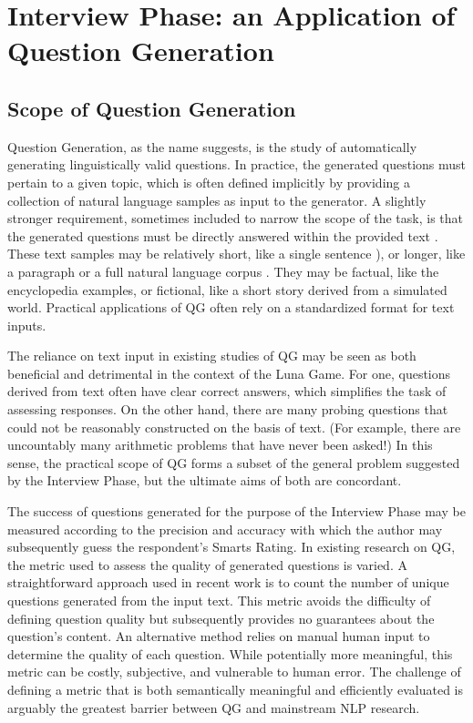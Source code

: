 \section{Interview Phase: an Application of Question Generation}

\subsection{Scope of Question Generation}

Question Generation, as the name suggests, is the study of automatically generating linguistically valid questions. In practice, the generated questions must pertain to a given topic, which is often defined implicitly by providing a collection of natural language samples as input to the generator. A slightly stronger requirement, sometimes included to narrow the scope of the task, is that the generated questions must be directly answered within the provided text  \citep{rus2011question, heilman2011automatic} . These text samples may be relatively short, like a single sentence \citep{ali2010automatic, rus2011question}), or longer, like a paragraph \citep{mannem2010question} or a full natural language corpus  \citep{heilman2011automatic}. They may be factual, like the encyclopedia examples, or fictional, like a short story derived from a simulated world. Practical applications of QG often rely on a standardized format for text inputs. 

The reliance on text input in existing studies of QG may be seen as both beneficial and detrimental in the context of the Luna Game. For one, questions derived from text often have clear correct answers, which simplifies the task of assessing responses. On the other hand, there are many probing questions that could not be reasonably constructed on the basis of text. (For example, there are uncountably many arithmetic problems that have never been asked!) In this sense, the practical scope of QG forms a subset of the general problem suggested by the Interview Phase, but the ultimate aims of both are concordant. 

The success of questions generated for the purpose of the Interview Phase may be measured according to the precision and accuracy with which the author may subsequently guess the respondent's Smarts Rating. In existing research on QG, the metric used to assess the quality of generated questions is varied. A straightforward approach used in recent work is to count the number of unique questions generated from the input text. This metric avoids the difficulty of defining question quality but subsequently provides no guarantees about the question's content. An alternative method relies on manual human input to determine the quality of each question. While potentially more meaningful, this metric can be costly, subjective, and vulnerable to human error. The challenge of defining a metric that is both semantically meaningful and efficiently evaluated is arguably the greatest barrier between QG and mainstream NLP research.

